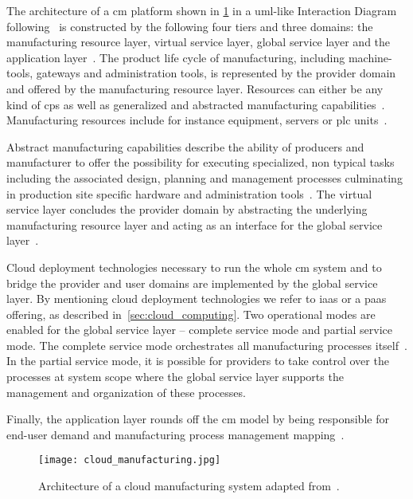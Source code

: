 \documentclass[
a4paper,
twoside,
headsepline,
cleardoublepage=empty,
parskip=half,
draft=false
]{scrbook}
\begin{document}
			The architecture of a \gls{cm} platform shown in \cref{fig:cloud_manufacturing} in a \gls{uml}-like Interaction Diagram following~\cite{uml2017} is constructed by the following four tiers and three domains: the manufacturing resource layer, virtual service layer, global service layer and the application layer~\cite{wu2013cloud}.
			The product life cycle of manufacturing, including machine-tools, gateways and administration tools, is represented by the provider domain and offered by the manufacturing resource layer.
			Resources can either be any kind of \gls{cps} as well as generalized and abstracted manufacturing capabilities~\cite{kleinemeier2014automatisierungspyramide}.
			Manufacturing resources include for instance equipment, servers or \gls{plc} units~\cite{xu2012cloud}.
			
			Abstract manufacturing capabilities describe the ability of producers and manufacturer to offer the possibility for executing specialized, non typical tasks including the associated design, planning and management processes culminating in production site specific hardware and administration tools~\cite{he2015state}.
			The virtual service layer concludes the provider domain by abstracting the underlying manufacturing resource layer and acting as an interface for the global service layer~\cite{xu2012cloud}.
			
			Cloud deployment technologies necessary to run the whole \gls{cm} system and to bridge the provider and user domains are implemented by the global service layer.
			By mentioning cloud deployment technologies we refer to \gls{iaas} or a \gls{paas} offering, as described in~\cref{sec:cloud_computing}.
			Two operational modes are enabled for the global service layer -- complete service mode and partial service mode.
			The complete service mode orchestrates all manufacturing processes itself~\cite{xu2012cloud}.
			In the partial service mode, it is possible for providers to take control over the processes at system scope where the global service layer supports the management and organization of these processes.
			
			Finally, the application layer rounds off the \gls{cm} model by being responsible for end-user demand and manufacturing process management mapping~\cite{xu2012cloud}.
			
			\begin{figure}[htbp]
				\centering
				\texttt{[image: cloud\_manufacturing.jpg]}
				\caption{Architecture of a cloud manufacturing system adapted from~\cite{xu2012cloud}.}
				\label{fig:cloud_manufacturing}
			\end{figure}
\end{document}
